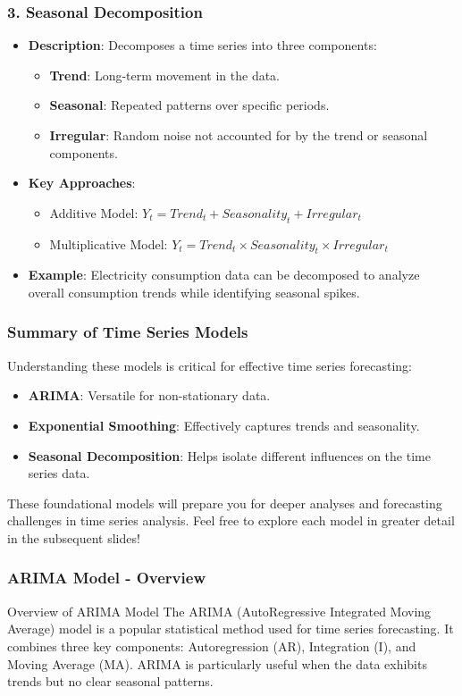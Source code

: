 \documentclass[aspectratio=169]{beamer}
\begin{document}
\begin{frame}[fragile]
    \frametitle{3. Seasonal Decomposition}
    \begin{itemize}
        \item \textbf{Description}: Decomposes a time series into three components:
        \begin{itemize}
            \item \textbf{Trend}: Long-term movement in the data.
            \item \textbf{Seasonal}: Repeated patterns over specific periods.
            \item \textbf{Irregular}: Random noise not accounted for by the trend or seasonal components.
        \end{itemize}
        \item \textbf{Key Approaches}:
        \begin{itemize}
            \item Additive Model: $Y_t = Trend_t + Seasonality_t + Irregular_t$
            \item Multiplicative Model: $Y_t = Trend_t \times Seasonality_t \times Irregular_t$
        \end{itemize}
        \item \textbf{Example}: Electricity consumption data can be decomposed to analyze overall consumption trends while identifying seasonal spikes.
    \end{itemize}
\end{frame}

\begin{frame}[fragile]
    \frametitle{Summary of Time Series Models}
    Understanding these models is critical for effective time series forecasting:
    \begin{itemize}
        \item \textbf{ARIMA}: Versatile for non-stationary data.
        \item \textbf{Exponential Smoothing}: Effectively captures trends and seasonality.
        \item \textbf{Seasonal Decomposition}: Helps isolate different influences on the time series data.
    \end{itemize}
    These foundational models will prepare you for deeper analyses and forecasting challenges in time series analysis. Feel free to explore each model in greater detail in the subsequent slides!
\end{frame}

\begin{frame}[fragile]
    \frametitle{ARIMA Model - Overview}
    \begin{block}{Overview of ARIMA Model}
        The ARIMA (AutoRegressive Integrated Moving Average) model is a popular statistical method used for time series forecasting. 
        It combines three key components: Autoregression (AR), Integration (I), and Moving Average (MA). ARIMA is particularly useful when the data exhibits trends but no clear seasonal patterns.
    \end{block}
\end{frame}
\end{document}
